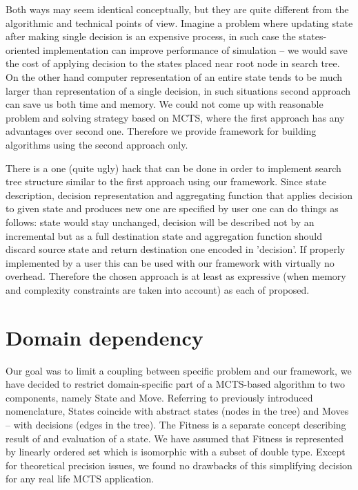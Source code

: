 Both ways may seem identical conceptually, but they are quite different from
the algorithmic and technical points of view.
Imagine a problem where updating state after making single decision is an
expensive process, in such case the states-oriented implementation can improve
performance of simulation -- we would save the cost of applying decision to the
states placed near root node in search tree.
On the other hand computer representation of an entire state tends to be much
larger than representation of a single decision, in such situations second
approach can save us both time and memory.
We could not come up with reasonable problem and solving strategy based on
MCTS, where the first approach has any advantages over second one. Therefore we
provide framework for building algorithms using the second approach only.

There is a one (quite ugly) hack that can be done in order to implement search
tree structure similar to the first approach using our framework. Since state
description, decision representation and aggregating function that applies
decision to given state and produces new one are specified by user one can do
things as follows: state would stay unchanged, decision will be described not
by an incremental but as a full destination state and aggregation function
should discard source state and return destination one encoded in 'decision'.
If properly implemented by a user this can be used with our framework with
virtually no overhead. Therefore the chosen approach is at least as expressive
(when memory and complexity constraints are taken into account) as each of
proposed.

\section{Domain dependency}
Our goal was to limit a coupling between specific problem and our framework, we
have decided to restrict domain-specific part of a MCTS-based algorithm to two
components, namely State and Move. Referring to previously introduced
nomenclature, States coincide with abstract states (nodes in the tree) and
Moves -- with decisions (edges in the tree).
The Fitness is a separate concept describing result of and evaluation of a
state. We have assumed that Fitness is represented by linearly ordered set
which is isomorphic with a subset of double type. Except for theoretical
precision issues, we found no drawbacks of this simplifying decision for any
real life MCTS application.


